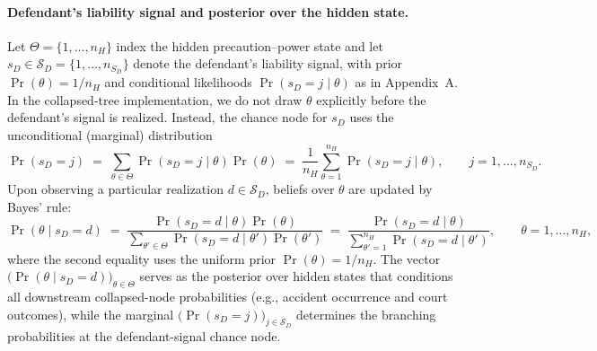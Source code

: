 \documentclass{article}
\begin{document}
\paragraph{Defendant’s liability signal and posterior over the hidden state.}
Let $\Theta=\{1,\dots,n_H\}$ index the hidden precaution–power state and let $s_D\in\mathcal{S}_D=\{1,\dots,n_{S_D}\}$ denote the defendant’s liability signal, with prior $\Pr(\theta)=1/n_H$ and conditional likelihoods $\Pr(s_D=j\mid \theta)$ as in Appendix~A. In the collapsed-tree implementation, we do not draw $\theta$ explicitly before the defendant’s signal is realized. Instead, the chance node for $s_D$ uses the unconditional (marginal) distribution
\[
\Pr(s_D=j)
\;=\;
\sum_{\theta\in\Theta}\Pr(s_D=j\mid \theta)\Pr(\theta)
\;=\;
\frac{1}{n_H}\sum_{\theta=1}^{n_H}\Pr(s_D=j\mid \theta),
\qquad j=1,\dots,n_{S_D}.
\]
Upon observing a particular realization $d\in\mathcal{S}_D$, beliefs over $\theta$ are updated by Bayes’ rule:
\[
\Pr(\theta\mid s_D=d)
\;=\;
\frac{\Pr(s_D=d\mid \theta)\Pr(\theta)}{\sum_{\theta'\in\Theta}\Pr(s_D=d\mid \theta')\Pr(\theta')}
\;=\;
\frac{\Pr(s_D=d\mid \theta)}{\sum_{\theta'=1}^{n_H}\Pr(s_D=d\mid \theta')},
\qquad \theta=1,\dots,n_H,
\]
where the second equality uses the uniform prior $\Pr(\theta)=1/n_H$. The vector $\bigl(\Pr(\theta\mid s_D=d)\bigr)_{\theta\in\Theta}$ serves as the posterior over hidden states that conditions all downstream collapsed-node probabilities (e.g., accident occurrence and court outcomes), while the marginal $\bigl(\Pr(s_D=j)\bigr)_{j\in\mathcal{S}_D}$ determines the branching probabilities at the defendant-signal chance node.

\printbibliography
\end{document}
